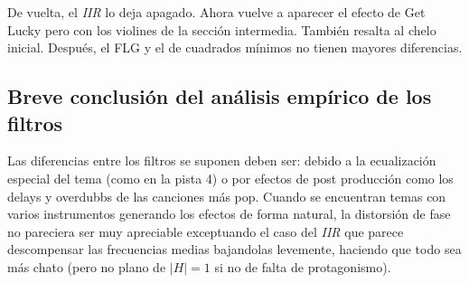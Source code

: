 	De vuelta, el \emph{IIR} lo deja apagado. Ahora vuelve a aparecer el efecto de Get Lucky pero con los violines de la sección intermedia. También resalta al chelo inicial. Después, el FLG y el de cuadrados mínimos no tienen mayores diferencias.

	\subsection{Breve conclusión del análisis empírico de los filtros}

	Las diferencias entre los filtros se suponen deben ser: debido a la ecualización especial del tema (como en la pista 4) o por efectos de post producción como los delays y overdubbs de las canciones más pop. Cuando se encuentran temas con varios instrumentos generando los efectos de forma natural, la distorsión de fase no pareciera ser muy apreciable exceptuando el caso del \emph{IIR} que parece descompensar las frecuencias medias bajandolas levemente, haciendo que todo sea más chato (pero no plano de $|H|=1$ si no de falta de protagonismo).
